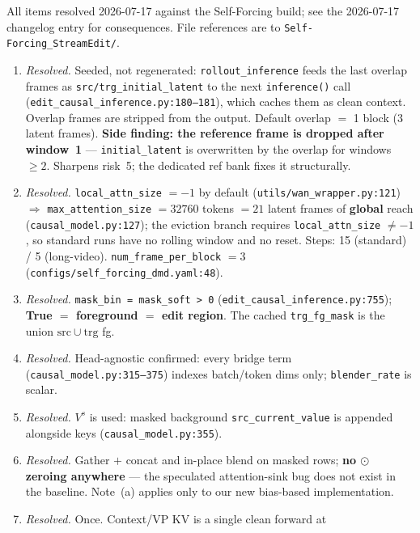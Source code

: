 \documentclass{article}
\begin{document}
All items resolved 2026-07-17 against the Self-Forcing build; see the
2026-07-17 changelog entry for consequences. File references are to
\texttt{Self-Forcing\_StreamEdit/}.

\begin{enumerate}
  \item \emph{Resolved.} Seeded, not regenerated:
        \texttt{rollout\_inference} feeds the last overlap frames as
        \texttt{src/trg\_initial\_latent} to the next \texttt{inference()} call
        (\texttt{edit\_causal\_inference.py:180--181}), which caches them as
        clean context. Overlap frames are stripped from the output. Default
        overlap $=$ 1 block (3 latent frames). \textbf{Side finding: the
        reference frame is dropped after window~1} --- \texttt{initial\_latent}
        is overwritten by the overlap for windows $\ge 2$. Sharpens risk~5; the
        dedicated ref bank fixes it structurally.
  \item \emph{Resolved.} \texttt{local\_attn\_size} $= -1$ by default
        (\texttt{utils/wan\_wrapper.py:121}) $\Rightarrow$
        \texttt{max\_attention\_size} $= 32760$ tokens $= 21$ latent frames of
        \textbf{global} reach (\texttt{causal\_model.py:127}); the eviction
        branch requires \texttt{local\_attn\_size} $\ne -1$, so standard runs
        have no rolling window and no reset. Steps: 15 (standard) / 5
        (long-video). \texttt{num\_frame\_per\_block} $= 3$
        (\texttt{configs/self\_forcing\_dmd.yaml:48}).
  \item \emph{Resolved.} \texttt{mask\_bin = mask\_soft > 0}
        (\texttt{edit\_causal\_inference.py:755}); \textbf{True $=$ foreground
        $=$ edit region}. The cached \texttt{trg\_fg\_mask} is the union
        $\mathrm{src} \cup \mathrm{trg}$ fg.
  \item \emph{Resolved.} Head-agnostic confirmed: every bridge term
        (\texttt{causal\_model.py:315--375}) indexes batch/token dims only;
        \texttt{blender\_rate} is scalar.
  \item \emph{Resolved.} $V^{s}$ is used: masked background
        \texttt{src\_current\_value} is appended alongside keys
        (\texttt{causal\_model.py:355}).
  \item \emph{Resolved.} Gather $+$ concat and in-place blend on masked rows;
        \textbf{no $\odot$ zeroing anywhere} --- the speculated attention-sink
        bug does not exist in the baseline. Note~(a) applies only to our new
        bias-based implementation.
  \item \emph{Resolved.} Once. Context/VP KV is a single clean forward at

\end{enumerate}
\end{document}
